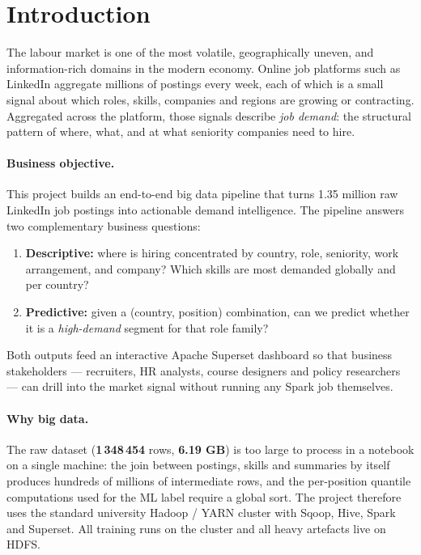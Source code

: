 \documentclass[11pt,a4paper]{article}
\begin{document}
\section{Introduction}
\label{sec:introduction}

The labour market is one of the most volatile, geographically uneven,
and information-rich domains in the modern economy.  Online job
platforms such as LinkedIn aggregate millions of postings every week,
each of which is a small signal about which roles, skills, companies
and regions are growing or contracting.  Aggregated across the
platform, those signals describe \emph{job demand}: the structural
pattern of where, what, and at what seniority companies need to hire.

\paragraph{Business objective.}
This project builds an end-to-end big data pipeline that turns 1.35
million raw LinkedIn job postings into actionable demand intelligence.
The pipeline answers two complementary business questions:

\begin{enumerate}[label=(Q\arabic*),leftmargin=*]
  \item \textbf{Descriptive:} where is hiring concentrated by country,
    role, seniority, work arrangement, and company? Which skills are
    most demanded globally and per country?
  \item \textbf{Predictive:} given a (country, position) combination,
    can we predict whether it is a \emph{high-demand} segment for that
    role family?
\end{enumerate}

Both outputs feed an interactive Apache Superset dashboard so that
business stakeholders --- recruiters, HR analysts, course designers
and policy researchers --- can drill into the market signal without
running any Spark job themselves.

\paragraph{Why big data.}
The raw dataset (\textbf{1\,348\,454} rows, \textbf{6.19 GB}) is too
large to process in a notebook on a single machine: the join between
postings, skills and summaries by itself produces hundreds of
millions of intermediate rows, and the per-position quantile
computations used for the ML label require a global sort.  The
project therefore uses the standard university Hadoop / YARN cluster
with Sqoop, Hive, Spark and Superset.  All training runs on the
cluster and all heavy artefacts live on HDFS.
\end{document}
